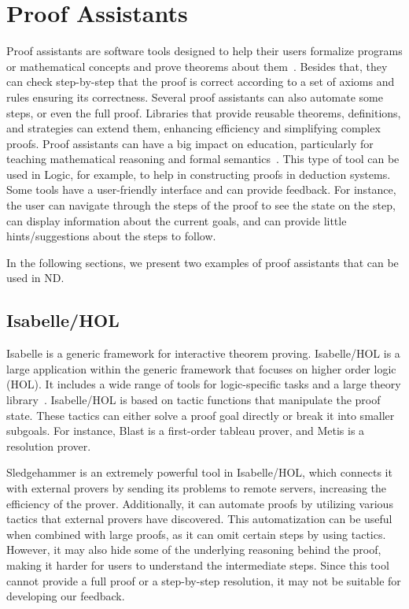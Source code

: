 \section{Proof Assistants}
\label{chap:assistants}
Proof assistants are software tools designed to help their users formalize programs or mathematical concepts and prove theorems about them~\cite{andersschlichtkrull_2015_formalization}. Besides that, they can check step-by-step that the proof is correct according to a set of axioms and rules ensuring its correctness. Several proof assistants can also automate some steps, or even the full proof. Libraries that provide reusable theorems, definitions, and strategies can extend them, enhancing efficiency and simplifying complex proofs. Proof assistants can have a big impact on education, particularly for teaching mathematical reasoning and formal semantics~\cite{evmorfiairobartzia_2023_proof}. This type of tool can be used in Logic, for example, to help in constructing proofs in deduction systems. Some tools have a user-friendly interface and can provide feedback. For instance, the user can navigate through the steps of the proof to see the state on the step, can display information about the current goals, and can provide little hints/suggestions about the steps to follow.

In the following sections, we present two examples of proof assistants that can be used in \gls{ND}.

\subsection{Isabelle/HOL}
Isabelle is a generic framework for interactive theorem proving. Isabelle/HOL is a large application within the generic framework that focuses on higher order logic (HOL). It includes a wide range of tools for logic-specific tasks and a large theory library~\cite{wenzel_the,blanchette_automatic}. Isabelle/HOL is based on tactic functions that manipulate the proof state. These tactics can either solve a proof goal directly or break it into smaller subgoals. For instance, Blast is a first-order tableau prover, and Metis is a resolution prover.

Sledgehammer is an extremely powerful tool in Isabelle/HOL, which connects it with external provers by sending its problems to remote servers, increasing the efficiency of the prover. Additionally, it can automate proofs by utilizing various tactics that external provers have discovered. This automatization can be useful when combined with large proofs, as it can omit certain steps by using tactics. However, it may also hide some of the underlying reasoning behind the proof, making it harder for users to understand the intermediate steps. Since this tool cannot provide a full proof or a step-by-step resolution, it may not be suitable for developing our feedback.

